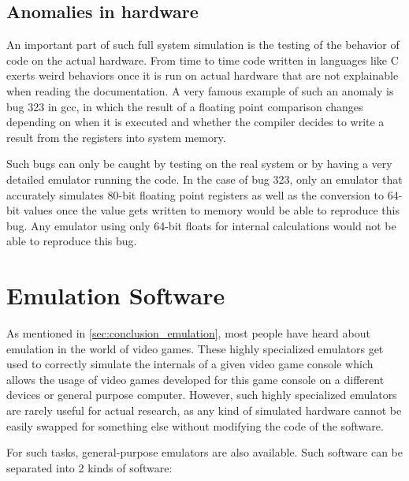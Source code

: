 \subsection{Anomalies in hardware}
An important part of such full system simulation is the testing of the behavior of code on the actual hardware.
From time to time code written in languages like C exerts weird behaviors once it is run on actual hardware
that are not explainable when reading the documentation.
A very famous example of such an anomaly is bug 323\cite{323} in gcc,
in which the result of a floating point comparison changes depending on when it is executed
and whether the compiler decides to write a result from the registers into system memory.

Such bugs can only be caught by testing on the real system
or by having a very detailed emulator running the code.
In the case of bug 323, only an emulator that accurately simulates 80-bit floating point registers
as well as the conversion to 64-bit values once the value gets written to memory
would be able to reproduce this bug.
Any emulator using only 64-bit floats for internal calculations would not be able to reproduce this bug.

\section{Emulation Software}\label{sec:emulators}
As mentioned in \autoref{sec:conclusion_emulation}, most people have heard about emulation in the world of video games.
These highly specialized emulators get used to correctly simulate the internals of a given video game console
which allows the usage of video games developed for this game console on a different devices or general purpose computer.
However, such highly specialized emulators are rarely useful for actual research,
as any kind of simulated hardware cannot be easily swapped for something else without modifying the code of the software.

For such tasks, general-purpose emulators are also available.
Such software can be separated into 2 kinds of software:

